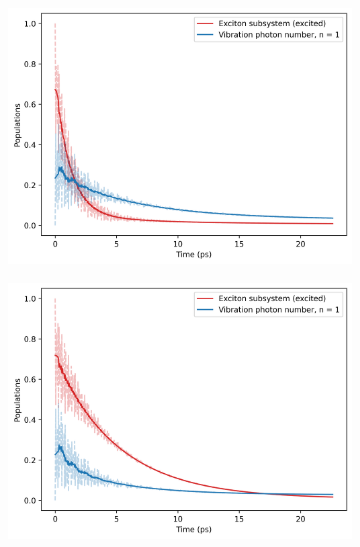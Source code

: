 \documentclass[11pt]{article}
\newcounter{subsubsubsection}[subsubsection]
\begin{document}
\begin{figure}[H]
    \centering
    \begin{subfigure}{0.45\textwidth}
        \centering
        \includegraphics[width=\linewidth]{Research Project/Code/results/ExVib/Open/Population/pops_ex_spont_e0.png}
        \caption{}
        \label{fig:EVM_OQS_Pop_spont}
    \end{subfigure}
    \hfill
    \begin{subfigure}{0.45\textwidth}
        \centering
        \includegraphics[width=\linewidth]{Research Project/Code/results/ExVib/Open/Population/pops_ex_therm_e0.png}
        \caption{}
        \label{fig:EVM_OQS_Pop_therm}
    \end{subfigure}
    

\end{figure}
\end{document}
